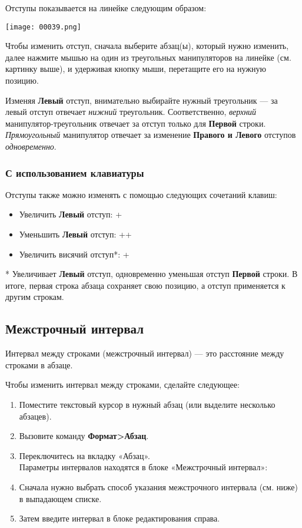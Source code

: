 ﻿\documentclass[a4paper,10pt]{article}
\begin{document}
Отступы показывается на линейке следующим образом:

\texttt{[image: 00039.png]}

Чтобы изменить отступ, сначала выберите абзац(ы), который нужно изменить, далее нажмите мышью на один из треугольных манипуляторов на линейке (см. картинку выше), и удерживая кнопку мыши, перетащите его на нужную позицию.

Изменяя \textbf{Левый} отступ, внимательно выбирайте нужный треугольник — за левый отступ отвечает \textit{нижний} треугольник. Соответственно, \textit{верхний} манипулятор-треугольник отвечает за отступ только для \textbf{Первой} строки. \textit{Прямоугольный} манипулятор отвечает за изменение \textbf{Правого и Левого} отступов \textit{одновременно}.

\subsubsection{С использованием клавиатуры}
Отступы также можно изменять с помощью следующих сочетаний клавиш:
\begin{itemize}
 \item Увеличить \textbf{Левый} отступ: +
 \item Уменьшить \textbf{Левый} отступ: ++
 \item Увеличить висячий отступ*: + 
\end{itemize}

* Увеличивает \textbf{Левый} отступ, одновременно уменьшая отступ \textbf{Первой} строки. В итоге, первая строка абзаца сохраняет свою позицию, а отступ применяется к другим строкам.

\subsection{Межстрочный интервал}
Интервал между строками (межстрочный интервал) — это расстояние между строками в абзаце. 

Чтобы изменить интервал между строками, сделайте следующее:
\begin{enumerate}
 \item Поместите текстовый курсор в нужный абзац (или выделите несколько абзацев).
 \item Вызовите команду \textbf{Формат>Абзац}.
 \item Переключитесь на вкладку «Абзац».\\
 Параметры интервалов находятся в блоке «Межстрочный интервал»:
 \item Сначала нужно выбрать способ указания межстрочного интервала (см. ниже) в выпадающем списке.
 \item Затем введите интервал в блоке редактирования справа.
\end{enumerate}
\end{document}
